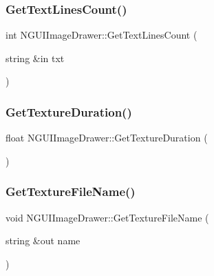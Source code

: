\hypertarget{class_n_g_u_i_image_drawer_ace0f90e13039f327851cc0b201487d7d}{}\label{class_n_g_u_i_image_drawer_ace0f90e13039f327851cc0b201487d7d} 
\subsubsection{\texorpdfstring{Get\+Text\+Lines\+Count()}{GetTextLinesCount()}}
{\footnotesize\ttfamily int N\+G\+U\+I\+Image\+Drawer\+::\+Get\+Text\+Lines\+Count (\begin{DoxyParamCaption}\item[{string \&in}]{txt }\end{DoxyParamCaption})}

\hypertarget{class_n_g_u_i_image_drawer_a1cea5dffb33438c1fab42e00d652f088}{}\label{class_n_g_u_i_image_drawer_a1cea5dffb33438c1fab42e00d652f088} 
\subsubsection{\texorpdfstring{Get\+Texture\+Duration()}{GetTextureDuration()}}
{\footnotesize\ttfamily float N\+G\+U\+I\+Image\+Drawer\+::\+Get\+Texture\+Duration (\begin{DoxyParamCaption}{ }\end{DoxyParamCaption})}

\hypertarget{class_n_g_u_i_image_drawer_a4a712ec2c705ecf5be02d9a0f067158d}{}\label{class_n_g_u_i_image_drawer_a4a712ec2c705ecf5be02d9a0f067158d} 
\subsubsection{\texorpdfstring{Get\+Texture\+File\+Name()}{GetTextureFileName()}}
{\footnotesize\ttfamily void N\+G\+U\+I\+Image\+Drawer\+::\+Get\+Texture\+File\+Name (\begin{DoxyParamCaption}\item[{string \&out}]{name }\end{DoxyParamCaption})}

